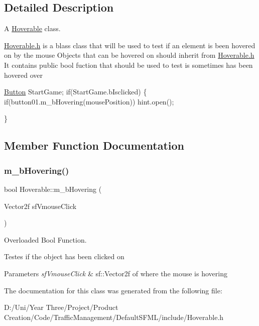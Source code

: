 \subsection{Detailed Description}
A \hyperlink{class_hoverable}{Hoverable} class.

\hyperlink{_hoverable_8h_source}{Hoverable.\+h} is a blass class that will be used to test if an element is been hovered on by the mouse Objects that can be hovered on should inherit from \hyperlink{_hoverable_8h_source}{Hoverable.\+h} It contains public bool fuction that should be used to test is sometimes has been hovered over 
\begin{DoxyCode}
\hyperlink{class_button}{Button} StartGame;
\textcolor{keywordflow}{if}(StartGame.bIsclicked)
\{
    \textcolor{keywordflow}{if}(button01.m\_bHovering(mousePosition)) hint.open();

\}
\end{DoxyCode}
 

\subsection{Member Function Documentation}
\hypertarget{class_hoverable_a5b2698e36a45fc22a0a45c74608213c5}{}\label{class_hoverable_a5b2698e36a45fc22a0a45c74608213c5} 
\subsubsection{\texorpdfstring{m\+\_\+b\+Hovering()}{m\_bHovering()}}
{\footnotesize\ttfamily bool Hoverable\+::m\+\_\+b\+Hovering (\begin{DoxyParamCaption}\item[{Vector2f}]{sf\+Vmouse\+Click }\end{DoxyParamCaption})}



Overloaded Bool Function. 

Testes if the object has been clicked on


\begin{DoxyParams}{Parameters}
{\em sf\+Vmouse\+Click} & sf\+::\+Vector2f of where the mouse is hovering \\
\hline
\end{DoxyParams}


The documentation for this class was generated from the following file\+:\begin{DoxyCompactItemize}
\item 
D\+:/\+Uni/\+Year Three/\+Project/\+Product Creation/\+Code/\+Traffic\+Management/\+Default\+S\+F\+M\+L/include/Hoverable.\+h\end{DoxyCompactItemize}
